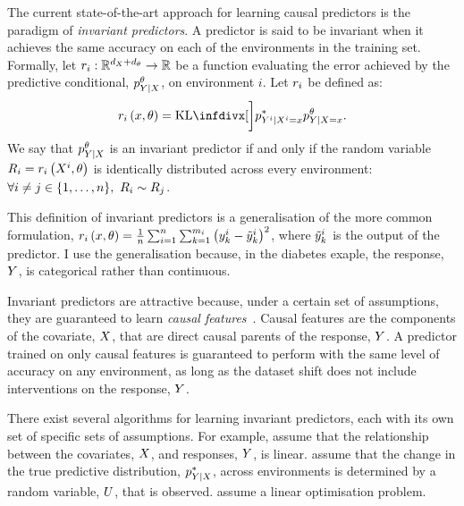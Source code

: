\documentclass[../thesis.tex]{subfiles}
\begin{document}
The current state-of-the-art approach for learning causal predictors is the paradigm of \textit{invariant predictors}. A predictor is said to be invariant when it achieves the same accuracy on each of the environments in the training set. Formally, let $\myfunc{r}_i: \mathbb{R}^{\mydim{x} + \mydim{\theta}} \to \mathbb{R}$ be a function evaluating the error achieved by the predictive conditional, $\myfunc{p}^{\theta}_{\myrv{y} | \myrv{x}}$, on environment $i$. Let $r_i$ be defined as:
\[
    \myfunc{r}_i \left( \myvect{x}, \theta \right) = \kl[\bigg]{\myfunc{p}^{*}_{\myrv{y}^i | \myrv{x}^i = \myvect{x}}}{\myfunc{p}^{\theta}_{\myrv{y} | \myrv{x} = \myvect{x}}}.
\]
We say that $\myfunc{p}^{\theta}_{\myrv{y} | \myrv{x}}$ is an invariant predictor if and only if the random variable $\myrv{r}_i = \myfunc{r}_i \left( \myrv{x}^i, \theta \right)$ is identically distributed across every environment: $\forall i \neq j \in \{1,\dots,\mycnt{n}\}, ~ \myrv{R}_i \sim \myrv{R}_j$. 

This definition of invariant predictors is a generalisation of the more common formulation, $r_i \left( x, \theta \right) = \frac{1}{n} \sum_{i=1}^{n} \sum_{k=1}^{m_i}  \left(y^i_k - \tilde{y}^i_k \right)^2$, where $\tilde{y}^i_k$ is the output of the predictor. I use the generalisation because, in the diabetes exaple, the response, $\myrv{y}$, is categorical rather than continuous.

Invariant predictors are attractive because, under a certain set of assumptions, they are guaranteed to learn \textit{causal features}~\citep{pearl2009causality, scholkopfCausalAnticausalLearning2012}. Causal features are the components of the covariate, $\myrv{x}$, that are direct causal parents of the response, $\myrv{y}$. A predictor trained on only causal features is guaranteed to perform with the same level of accuracy on any environment, as long as the dataset shift does not include interventions on the response, $\myrv{y}$.

There exist several algorithms for learning invariant predictors, each with its own set of specific sets of assumptions. For example, \citet{petersCausalInferenceUsing2016} assume that the relationship between the covariates, $\myrv{x}$, and responses, $\myrv{y}$, is linear. \citet{magliacane2018domain} assume that the change in the true predictive distribution, $\myfunc{p}^{*}_{\myrv{y} | \myrv{x}}$, across environments is determined by a random variable, $\myrv{u}$, that is observed. \citet{arjovskyInvariantRiskMinimization2019} assume a linear optimisation problem. 
\end{document}
